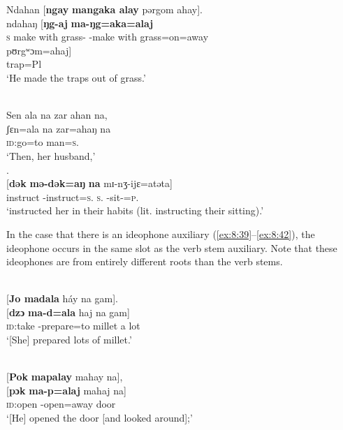 \ea \label{ex:8:37}
Ndahan  [\textbf{ngay}  \textbf{mangaka  alay}  pərgom  ahay].\\
\gll  ndahaŋ  [\textbf{ŋg-aj}       \textbf{ma-ŋg=aka=alaj}    \\  
      \textsc{s}    {make with grass}-{\CL}  {{\NOM}{}-make with grass}=on=away    \\   

\medskip     
\gll pʊrgʷɔm=ahaj]\\
trap=Pl\\
\glt  ‘He made the traps out of grass.’
\z


\ea \label{ex:8:38}\\
Sen  ala  na  zar  ahan  na,\\  
\gll  ʃɛn=ala     na   zar=ahaŋ    na \\
      \textsc{id}:go=to  {\PSP}    man=\textsc{s}.{\POSS}    {\PSP}\\
\glt ‘Then, her husband,’\\

. \\
\gll  {}[\textbf{dək} \textbf{mə{}-dək=aŋ}   \textbf{na}  mɪ{}-nʒ-ijɛ=atəta]\\
      instruct  {\NOM}{}-instruct=\textsc{s}.{\IO}   \textsc{s}.{\DO}   {\NOM}{}-sit-{\CL}=\textsc{p}.{\POSS}\\
\glt  ‘instructed her in their habits (lit. instructing their sitting).’ 
\z

In the case that there is an ideophone auxiliary (\ref{ex:8:39}--\ref{ex:8:42}), the ideophone occurs in the same slot as the verb stem auxiliary. Note that these ideophones are from entirely different roots than the verb stems. 

\clearpage
\ea \label{ex:8:39}\\
{}[\textbf{Jo madala}  háy  na  gam].\\
\gll  {}[\textbf{dzɔ}    \textbf{ma-d=ala}     haj  na      gam]\\
      \textsc{id}:take  {{\NOM}-prepare=to}  millet       {\PSP}  {a lot}\\
\glt  ‘[She] prepared lots of millet.’
\z

\ea \label{ex:8:40}\\
{}[\textbf{Pok} \textbf{mapalay}  mahay  na], \\ 
\gll  {}[\textbf{pɔk} \textbf{ma-p=alaj}      mahaj  na]\\
      \textsc{id}:open  {\NOM}{}-open=away   door     {\PSP}\\
\glt ‘[He] opened the door [and looked around];’\\

